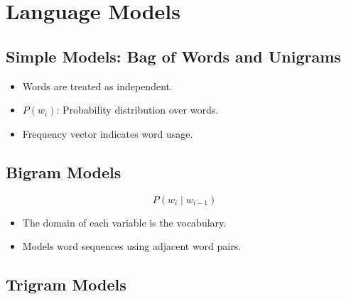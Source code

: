 \begin{center}
\end{center}


\section{Language Models}

\subsection*{Simple Models: Bag of Words and Unigrams}

\begin{itemize}
    \item Words are treated as independent.
    \item \( P(w_i) \): Probability distribution over words.
    \item Frequency vector indicates word usage.
\end{itemize}

\subsection*{Bigram Models}

\[
P(w_i \mid w_{i-1})
\]

\begin{itemize}
    \item The domain of each variable is the vocabulary.
    \item Models word sequences using adjacent word pairs.
\end{itemize}

\subsection*{Trigram Models}

